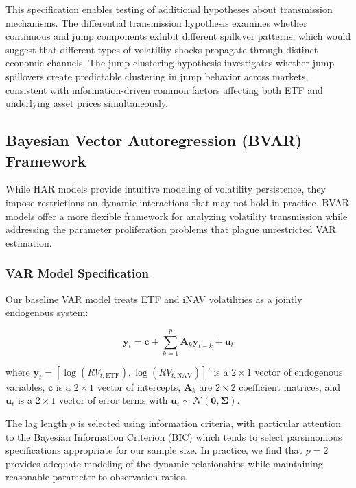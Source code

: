 This specification enables testing of additional hypotheses about transmission mechanisms. The differential transmission hypothesis examines whether continuous and jump components exhibit different spillover patterns, which would suggest that different types of volatility shocks propagate through distinct economic channels. The jump clustering hypothesis investigates whether jump spillovers create predictable clustering in jump behavior across markets, consistent with information-driven common factors affecting both ETF and underlying asset prices simultaneously.

\subsection{Bayesian Vector Autoregression (BVAR) Framework}

While HAR models provide intuitive modeling of volatility persistence, they impose restrictions on dynamic interactions that may not hold in practice. BVAR models offer a more flexible framework for analyzing volatility transmission while addressing the parameter proliferation problems that plague unrestricted VAR estimation.

\subsubsection{VAR Model Specification}

Our baseline VAR model treats ETF and iNAV volatilities as a jointly endogenous system:

\begin{equation} \label{eq:var_baseline}
\mathbf{y}_t = \mathbf{c} + \sum_{k=1}^{p} \mathbf{A}_k \mathbf{y}_{t-k} + \mathbf{u}_t
\end{equation}

where $\mathbf{y}_t = [\log(RV_{t,\text{ETF}}), \log(RV_{t,\text{NAV}})]'$ is a $2 \times 1$ vector of endogenous variables, $\mathbf{c}$ is a $2 \times 1$ vector of intercepts, $\mathbf{A}_k$ are $2 \times 2$ coefficient matrices, and $\mathbf{u}_t$ is a $2 \times 1$ vector of error terms with $\mathbf{u}_t \sim \mathcal{N}(\mathbf{0}, \mathbf{\Sigma})$.

The lag length $p$ is selected using information criteria, with particular attention to the Bayesian Information Criterion (BIC) which tends to select parsimonious specifications appropriate for our sample size. In practice, we find that $p = 2$ provides adequate modeling of the dynamic relationships while maintaining reasonable parameter-to-observation ratios.

